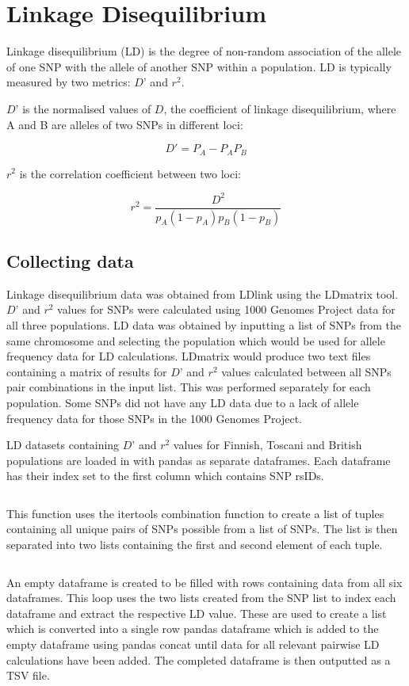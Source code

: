 \documentclass[12pt,a4paper]{article}
\newcommand{\mintfile}[1]{
\begin{tcolorbox}[colback=gray!5!white,%
	grow to left by=20mm,
    grow to right by=20mm,
    sharp corners]{{    \small \inputminted[breaklines]{python}{#1}		}}
\end{tcolorbox}}
\newcommand{\sect}[1]{
\clearpage
\hypertarget{#1}{
\section{#1}\label{#1}}
}
\newcommand{\subsect}[1]{
\FloatBarrier %
\hypertarget{#1}{
\subsection{#1}\label{#1}}
}
\begin{document}
\sect {Linkage Disequilibrium}

Linkage disequilibrium (LD) is the degree of non-random association of the allele of one SNP with the allele of another SNP within a population. LD is typically measured by two metrics: $D’$ and $r^2$.

$D’$ is the normalised values of $D$, the coefficient of linkage disequilibrium, where A and B are alleles of two SNPs in different loci:

\[D'=P_A -  P_A P_B\]

$r^2$  is the correlation coefficient between two loci:

\[r^2 = \frac{D^2}{p_A(1-p_A)p_B(1-p_B)} \]


\subsect{Collecting data}

Linkage disequilibrium data was obtained from LDlink using the LDmatrix tool. $D’$ and $r^2$ values for SNPs were calculated using 1000 Genomes Project data for all three populations. LD data was obtained by inputting a list of SNPs from the same chromosome and selecting the population which would be used for allele frequency data for LD calculations. LDmatrix would produce two text files containing a matrix of results for $D’$ and $r^2$ values calculated between all SNPs pair combinations in the input list. This was performed separately for each population. Some SNPs did not have any LD data due to a lack of allele frequency data for those SNPs in the 1000 Genomes Project.

LD datasets containing $D’$ and $r^2$  values for Finnish, Toscani and British populations are loaded in with pandas as separate dataframes. Each dataframe has their index set to the first column which contains SNP rsIDs.
\mintfile{code_snippets/placeholder.py}

This function uses the itertools combination function to create a list of tuples containing all unique pairs of SNPs possible from a list of SNPs. The list is then separated into two lists containing the first and second element of each tuple.
\mintfile{code_snippets/placeholder.py}

An empty dataframe is created to be filled with rows containing data from all six dataframes. This loop uses the two lists created from the SNP list to index each dataframe and extract the respective LD value. These are used to create a list which is converted into a single row pandas dataframe which is added to the empty dataframe using pandas concat until data for all relevant pairwise LD calculations have been added. The completed dataframe is then outputted as a TSV file.
\mintfile{code_snippets/placeholder.py}
\end{document}
